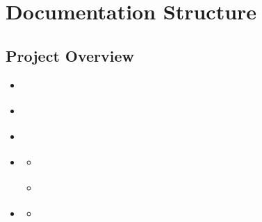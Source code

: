 \documentclass[letterpaper,10pt,english]{sphinxmanual}
\begin{document}
\chapter{Documentation Structure}
\label{\detokenize{index:documentation-structure}}
\sphinxstepscope


\section{Project Overview}
\label{\detokenize{overview/index:project-overview}}\label{\detokenize{overview/index::doc}}
\begin{sphinxShadowBox}
\begin{itemize}
\item {} 
\sphinxAtStartPar
{}\label{\detokenize{overview/index:id2}}{\hyperref[\detokenize{overview/index:executive-summary}]{}}

\item {} 
\sphinxAtStartPar
{}\label{\detokenize{overview/index:id3}}{\hyperref[\detokenize{overview/index:what-is-provchainorg}]{}}

\item {} 
\sphinxAtStartPar
{}\label{\detokenize{overview/index:id4}}{\hyperref[\detokenize{overview/index:key-innovations}]{}}

\item {} 
\sphinxAtStartPar
{}\label{\detokenize{overview/index:id5}}{\hyperref[\detokenize{overview/index:business-value-proposition}]{}}
\begin{itemize}
\item {} 
\sphinxAtStartPar
{}\label{\detokenize{overview/index:id6}}{\hyperref[\detokenize{overview/index:supply-chain-transparency}]{}}

\item {} 
\sphinxAtStartPar
{}\label{\detokenize{overview/index:id7}}{\hyperref[\detokenize{overview/index:competitive-advantages}]{}}

\end{itemize}

\item {} 
\sphinxAtStartPar
{}\label{\detokenize{overview/index:id8}}{\hyperref[\detokenize{overview/index:technical-highlights}]{}}
\begin{itemize}
\item {} 
\sphinxAtStartPar
{}\label{\detokenize{overview/index:id9}}{\hyperref[\detokenize{overview/index:modern-rust-implementation}]{}}


\end{itemize}
\end{itemize}
\end{sphinxShadowBox}
\end{document}
